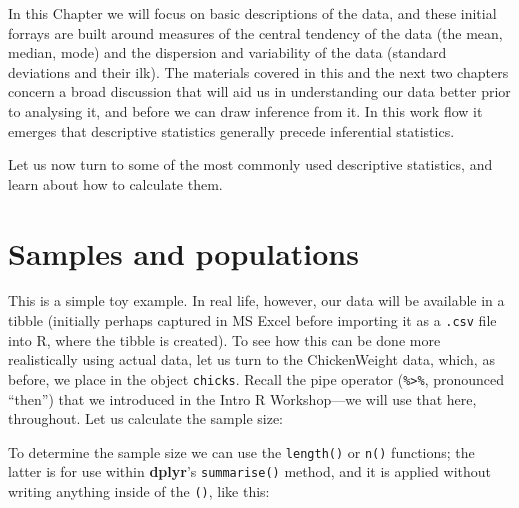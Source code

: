\documentclass[english,10pt,a4paper,oneside]{book}
\newenvironment{Shaded}{\begin{snugshade}}{\end{snugshade}}
\newcommand{\CommentTok}[1]{\textcolor[rgb]{0.56,0.35,0.01}{\textit{#1}}}
\newcommand{\DataTypeTok}[1]{\textcolor[rgb]{0.13,0.29,0.53}{#1}}
\newcommand{\KeywordTok}[1]{\textcolor[rgb]{0.13,0.29,0.53}{\textbf{#1}}}
\newcommand{\NormalTok}[1]{#1}
\newcommand{\OperatorTok}[1]{\textcolor[rgb]{0.81,0.36,0.00}{\textbf{#1}}}
\newcommand{\StringTok}[1]{\textcolor[rgb]{0.31,0.60,0.02}{#1}}
\theoremstyle{definition}
\theoremstyle{definition}
\theoremstyle{definition}
\theoremstyle{remark}
\begin{document}
In this Chapter we will focus on basic descriptions of the data, and
these initial forrays are built around measures of the central tendency
of the data (the mean, median, mode) and the dispersion and variability
of the data (standard deviations and their ilk). The materials covered
in this and the next two chapters concern a broad discussion that will
aid us in understanding our data better prior to analysing it, and
before we can draw inference from it. In this work flow it emerges that
descriptive statistics generally precede inferential statistics.

Let us now turn to some of the most commonly used descriptive
statistics, and learn about how to calculate them.

\hypertarget{samples-and-populations}{%
\section{Samples and populations}\label{samples-and-populations}}

This is a simple toy example. In real life, however, our data will be
available in a tibble (initially perhaps captured in MS Excel before
importing it as a \texttt{.csv} file into R, where the tibble is
created). To see how this can be done more realistically using actual
data, let us turn to the ChickenWeight data, which, as before, we place
in the object \texttt{chicks}. Recall the pipe operator
(\texttt{\%\textgreater{}\%}, pronounced \enquote{then}) that we
introduced in the Intro R Workshop---we will use that here, throughout.
Let us calculate the sample size:

To determine the sample size we can use the \texttt{length()} or
\texttt{n()} functions; the latter is for use within \textbf{dplyr}'s
\texttt{summarise()} method, and it is applied without writing anything
inside of the \texttt{()}, like this:

\begin{Shaded}
\end{Shaded}
\end{document}
